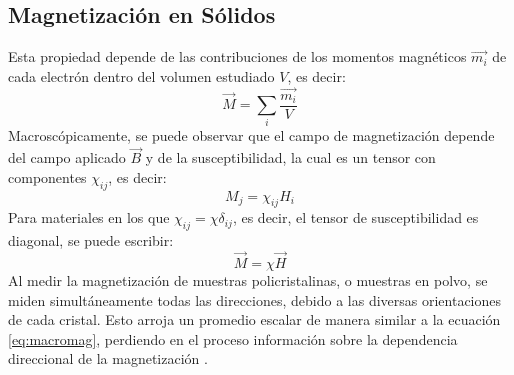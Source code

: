 \documentclass[../main.tex]{subfiles}
\begin{document}
\subsection{Magnetización en Sólidos}
Esta propiedad depende de las contribuciones de los momentos magnéticos $\vec{m_i}$ de cada electrón dentro del volumen estudiado $V$, es decir:
\begin{equation}
    \vec{M}=\sum_i\dfrac{\vec{m_i}}{V}
    \label{eq:micromag}
\end{equation}
Macroscópicamente, se puede observar que el campo de magnetización depende del campo aplicado $\vec{B}$ y de la susceptibilidad, la cual es un tensor con componentes $\chi_{ij}$, es decir:
\begin{equation}
    M_j=\chi_{ij}H_i
    \label{eq:tensormag}
\end{equation}
Para materiales en los que $\chi_{ij}=\chi\delta_{ij}$, es decir, el tensor de susceptibilidad es diagonal, se puede escribir:
\begin{equation}
    \vec{M}=\chi\vec{H}
    \label{eq:macromag}
\end{equation}
Al medir la magnetización de muestras policristalinas, o muestras en polvo, se miden simultáneamente todas las direcciones, debido a las diversas orientaciones de cada cristal. Esto arroja un promedio escalar de manera similar a la ecuación \ref{eq:macromag}, perdiendo en el proceso información sobre la dependencia direccional de la magnetización \cite{Mugiraneza2022}.
\end{document}
